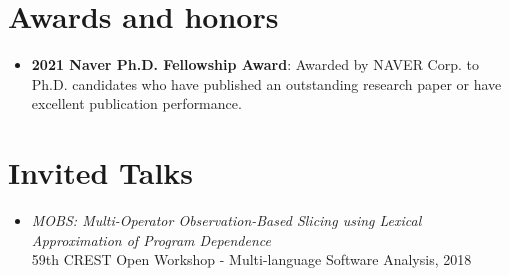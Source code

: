 \documentclass[letterpaper,11pt]{article}
\begin{document}
\section{Awards and honors}
  \begin{itemize}
    \item \textbf{2021 Naver Ph.D. Fellowship Award}: Awarded by NAVER Corp. to Ph.D. candidates who have published an outstanding research paper or have excellent publication performance.
  \end{itemize}

\section{Invited Talks}
  \begin{itemize}
    \item \emph{MOBS: Multi-Operator Observation-Based Slicing using Lexical Approximation of Program Dependence} \\ 59th CREST Open Workshop - Multi-language Software Analysis, 2018
  \end{itemize}
\end{document}
